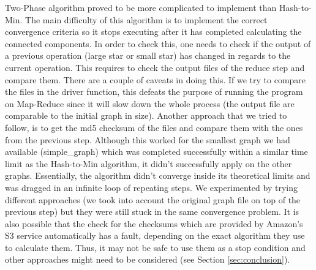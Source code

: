 Two-Phase algorithm proved to be more complicated to implement than Hash-to-Min. The main difficulty of this algorithm is to implement the correct convergence criteria so it stops executing after it has completed calculating the connected components. In order to check this, one needs to check if the output of a previous operation (large star or small star) has changed in regards to the current operation. This requires to check the output files of the reduce step and compare them. There are a couple of caveats in doing this. If we try to compare the files in the driver function, this defeats the purpose of running the program on Map-Reduce since it will slow down the whole process (the output file are comparable to the initial graph in size). Another approach that we tried to follow, is to get the md5 checksum of the files and compare them with the ones from the previous step. Although this worked for the smallest graph we had available (simple\_graph) which was completed successfully within a similar time limit as the Hash-to-Min algorithm, it didn't successfully apply on the other graphs. Essentially, the algorithm didn't converge inside its theoretical limits and was dragged in an infinite loop of repeating steps. We experimented by trying different approaches (\eg we took into account the original graph file on top of the previous step) but they were still stuck in the same convergence problem. It is also possible that the check for the checksums which are provided by Amazon's S3 service automatically has a fault, depending on the exact algorithm they use to calculate them. Thus, it may not be safe to use them as a stop condition and other approaches might need to be considered (see Section \ref{sec:conclusion}).

